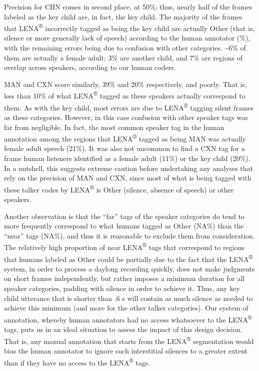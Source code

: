 \documentclass[english,table,man,floatsintext]{apa6}
\begin{document}
Precision for CHN comes in second place, at 50\%; thus, nearly half of the frames labeled as the key child are, in fact, the key child. The majority of the frames that LENA\textsuperscript{®} incorrectly tagged as being the key child are actually Other (that is, silence or more generally lack of speech) according to the human annotator (\%), with the remaining errors being due to confusion with other categories. \textasciitilde{}6\% of them are actually a female adult; 3\% are another child, and 7\% are regions of overlap across speakers, according to our human coders.

MAN and CXN score similarly, 39\% and 20\% respectively, and poorly. That is, less than 10\% of what LENA\textsuperscript{®} tagged as these speakers actually correspond to them. As with the key child, most errors are due to LENA\textsuperscript{®} tagging silent frames as these categories. However, in this case confusion with other speaker tags was far from negligible. In fact, the most common speaker tag in the human annotation among the regions that LENA\textsuperscript{®} tagged as being MAN was actually female adult speech (21\%). It was also not uncommon to find a CXN tag for a frame human listeners identified as a female adult (11\%) or the key child (20\%). In a nutshell, this suggests extreme caution before undertaking any analyses that rely on the precision of MAN and CXN, since most of what is being tagged with these talker codes by LENA\textsuperscript{®} is Other (silence, absence of speech) or other speakers.

Another observation is that the \enquote{far} tags of the speaker categories do tend to more frequently correspond to what humans tagged as Other (NA\%) than the \enquote{near} tags (NA\%), and thus it is reasonable to exclude them from consideration. The relatively high proportion of near LENA\textsuperscript{®} tags that correspond to regions that humans labeled as Other could be partially due to the fact that the LENA\textsuperscript{®} system, in order to process a daylong recording quickly, does not make judgments on short frames independently, but rather imposes a minimum duration for all speaker categories, padding with silence in order to achieve it. Thus, any key child utterance that is shorter than .6 s will contain as much silence as needed to achieve this minimum (and more for the other talker categories). Our system of annotation, whereby human annotators had no access whatsoever to the LENA\textsuperscript{®} tags, puts us in an ideal situation to assess the impact of this design decision. That is, any manual annotation that starts from the LENA\textsuperscript{®} segmentation would bias the human annotator to ignore such interstitial silences to a greater extent than if they have no access to the LENA\textsuperscript{®} tags.
\end{document}
